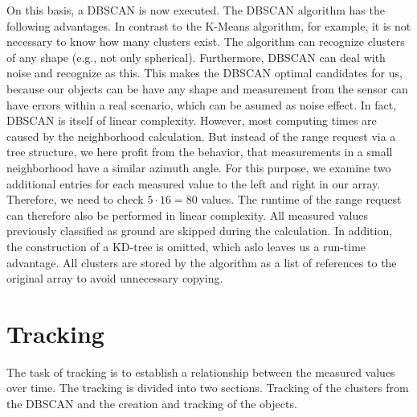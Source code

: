 \documentclass[11pt,oneside,openright]{mpreport}
\begin{document}
On this basis, a \ac{DBSCAN} \cite{DBSCAN} is now executed. The \ac{DBSCAN} algorithm has the following advantages. In contrast to the K-Means algorithm,
for example, it is not necessary to know how many clusters exist. The algorithm can recognize clusters of any shape (e.g., not only spherical).
Furthermore, \ac{DBSCAN} can deal with noise and recognize as this. This makes the \ac{DBSCAN} optimal candidates for us, because our objects can be have any shape and 
measurement from the sensor can have errors within a real scenario, which can be asumed as noise effect. 
In fact, \ac{DBSCAN} is itself of linear complexity. However, most computing times are caused by the neighborhood calculation.
But instead of the range request via a tree structure, we here profit from the behavior, that measurements in a small neighborhood have a similar azimuth angle.
For this purpose, we examine two additional entries for each measured value to the left and right in our array. 
Therefore, we need to check $5 \cdot 16 = 80$ values. The runtime of the range request can therefore also be performed in linear complexity.
All measured values ​​previously classified as ground are skipped during the calculation. In addition, the construction of a KD-tree is omitted, which aslo leaves us a run-time advantage.
All clusters are stored by the algorithm as a list of references to the original array to avoid unnecessary copying.


\section{Tracking}
The task of tracking is to establish a relationship between the measured values over time. The tracking is divided into two sections.
Tracking of the clusters from the \ac{DBSCAN} and the creation and tracking of the objects.

\end{document}
